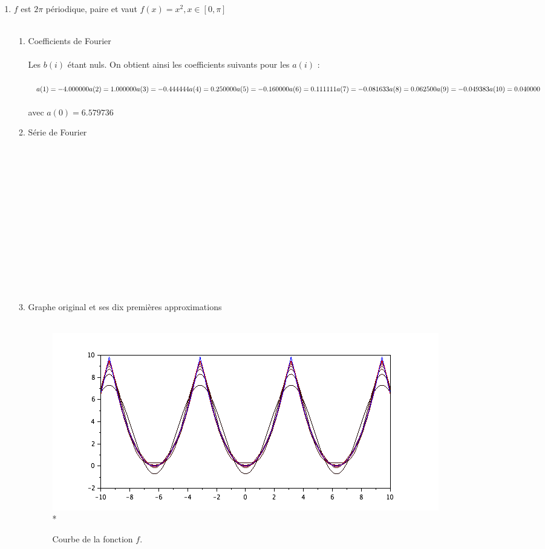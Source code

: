 \documentclass[a4paper,12pt]{report}
\begin{document}
\begin{enumerate}
		\item $f$ est $2\pi$ périodique, paire et vaut $f(x)=x^{2}, x \in [0,\pi]$ \\ \\
		\begin{enumerate}
			\item Coefficients de Fourier \\ \\
			Les $b(i)$ étant nuls. On obtient ainsi les coefficients suivants pour les $a(i)$ : \\ \\
			$a(1) = -4.000000\\
a(2) = 1.000000\\
a(3) = -0.444444\\
a(4) = 0.250000\\
a(5) = -0.160000\\
a(6) = 0.111111\\
a(7) = -0.081633\\
a(8) = 0.062500\\
a(9) = -0.049383\\
a(10) = 0.040000$\\ \\
avec $a(0) = 6.579736$\\
			\item Série de Fourier \\ \\ \\ \\ \\ \\ \\ \\ \\ \\ \\ \\ \\ \\

			\item Graphe original et ses dix premières approximations \\ \\
			\begin{figure}[h!]
				\centering
				\includegraphics[scale=0.6]{ex1_fig4_1.png}\\*
				\caption{\label{ex1_figure4_1}Courbe de la fonction $f$.}
			\end{figure}\\
		

\end{enumerate}
\end{enumerate}
\end{document}
